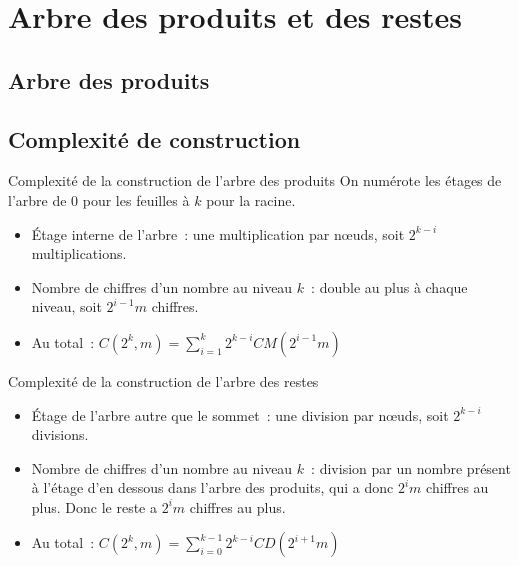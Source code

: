 \documentclass{beamer}
\begin{document}
\section{Arbre des produits et des restes}
\subsection{Arbre des produits}
%
%
\subsection{Complexité de construction}
\begin{frame}
  \begin{block}{Complexité de la construction de l'arbre des produits}
    On numérote les étages de l'arbre de $0$ pour les feuilles à $k$ pour la racine. 
    \begin{itemize}
      \item Étage interne de l'arbre~: une multiplication par nœuds, soit $2^{k-i}$ multiplications.
      \item Nombre de chiffres d'un nombre au niveau $k$~: double au plus à chaque niveau, soit $2^{i-1}m$ chiffres.
      \item Au total~: $C(2^k,m) = \sum_{i=1}^k 2^{k-i}CM(2^{i-1}m)$
    \end{itemize}
  \end{block}
\end{frame}

\begin{frame}
  \begin{block}{Complexité de la construction de l'arbre des restes}
    \begin{itemize}
      \item Étage de l'arbre autre que le sommet~: une division par nœuds, soit $2^{k-i}$ divisions.
      \item Nombre de chiffres d'un nombre au niveau $k$~: division par un nombre présent à l'étage d'en dessous dans l'arbre des produits, qui a donc $2^{i}m$ chiffres au plus. Donc le reste a $2^{i}m$ chiffres au plus.
      \item Au total~: $C(2^k,m) = \sum_{i=0}^{k-1} 2^{k-i}CD(2^{i+1}m)$
    \end{itemize}
  \end{block}
\end{frame}
\end{document}
